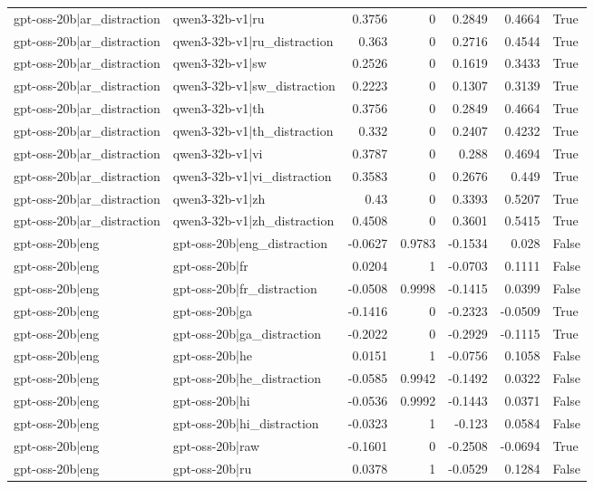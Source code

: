 \begin{table}
\begin{tabular}{l l r r r r l}
gpt-oss-20b|ar_distraction & qwen3-32b-v1|ru & 0.3756 & 0 & 0.2849 & 0.4664 & True \\
gpt-oss-20b|ar_distraction & qwen3-32b-v1|ru_distraction & 0.363 & 0 & 0.2716 & 0.4544 & True \\
gpt-oss-20b|ar_distraction & qwen3-32b-v1|sw & 0.2526 & 0 & 0.1619 & 0.3433 & True \\
gpt-oss-20b|ar_distraction & qwen3-32b-v1|sw_distraction & 0.2223 & 0 & 0.1307 & 0.3139 & True \\
gpt-oss-20b|ar_distraction & qwen3-32b-v1|th & 0.3756 & 0 & 0.2849 & 0.4664 & True \\
gpt-oss-20b|ar_distraction & qwen3-32b-v1|th_distraction & 0.332 & 0 & 0.2407 & 0.4232 & True \\
gpt-oss-20b|ar_distraction & qwen3-32b-v1|vi & 0.3787 & 0 & 0.288 & 0.4694 & True \\
gpt-oss-20b|ar_distraction & qwen3-32b-v1|vi_distraction & 0.3583 & 0 & 0.2676 & 0.449 & True \\
gpt-oss-20b|ar_distraction & qwen3-32b-v1|zh & 0.43 & 0 & 0.3393 & 0.5207 & True \\
gpt-oss-20b|ar_distraction & qwen3-32b-v1|zh_distraction & 0.4508 & 0 & 0.3601 & 0.5415 & True \\
gpt-oss-20b|eng & gpt-oss-20b|eng_distraction & -0.0627 & 0.9783 & -0.1534 & 0.028 & False \\
gpt-oss-20b|eng & gpt-oss-20b|fr & 0.0204 & 1 & -0.0703 & 0.1111 & False \\
gpt-oss-20b|eng & gpt-oss-20b|fr_distraction & -0.0508 & 0.9998 & -0.1415 & 0.0399 & False \\
gpt-oss-20b|eng & gpt-oss-20b|ga & -0.1416 & 0 & -0.2323 & -0.0509 & True \\
gpt-oss-20b|eng & gpt-oss-20b|ga_distraction & -0.2022 & 0 & -0.2929 & -0.1115 & True \\
gpt-oss-20b|eng & gpt-oss-20b|he & 0.0151 & 1 & -0.0756 & 0.1058 & False \\
gpt-oss-20b|eng & gpt-oss-20b|he_distraction & -0.0585 & 0.9942 & -0.1492 & 0.0322 & False \\
gpt-oss-20b|eng & gpt-oss-20b|hi & -0.0536 & 0.9992 & -0.1443 & 0.0371 & False \\
gpt-oss-20b|eng & gpt-oss-20b|hi_distraction & -0.0323 & 1 & -0.123 & 0.0584 & False \\
gpt-oss-20b|eng & gpt-oss-20b|raw & -0.1601 & 0 & -0.2508 & -0.0694 & True \\
gpt-oss-20b|eng & gpt-oss-20b|ru & 0.0378 & 1 & -0.0529 & 0.1284 & False \\

\end{tabular}
\end{table}
